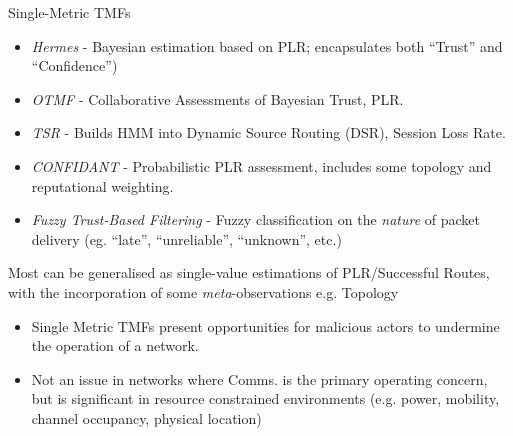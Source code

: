 \documentclass{beamer}
\begin{document}
\begin{frame}[allowframebreaks]{Single-Metric TMFs}
  \begin{itemize}
    \item \emph{Hermes} \cite{Zouridaki2005} - Bayesian estimation based on PLR; encapsulates both ``Trust'' and ``Confidence'')
    \item \emph{OTMF} \cite{Li2008} - Collaborative Assessments of Bayesian Trust, PLR.
    \item \emph{TSR} \cite{Moe2008a} - Builds HMM into Dynamic Source Routing (DSR), Session Loss Rate.
    \item \emph{CONFIDANT} \cite{Buchegger2002} - Probabilistic PLR assessment, includes some topology and reputational weighting.
    \item \emph{Fuzzy Trust-Based Filtering} \cite{Luo2008} - Fuzzy classification on the \emph{nature} of packet delivery (eg. ``late'', ``unreliable'', ``unknown'', etc.)
  \end{itemize}
  Most can be generalised as single-value estimations of PLR/Successful Routes, with the incorporation of some \emph{meta}-observations e.g. Topology
  \framebreak
  \begin{itemize}
  \item
    Single Metric TMFs present opportunities for malicious actors to undermine the operation of a network. 
  \item 
    Not an issue in networks where Comms. is the primary operating concern, but is significant in resource constrained environments (e.g. power, mobility, channel occupancy, physical location)
  \end{itemize}

\end{frame}
\end{document}
